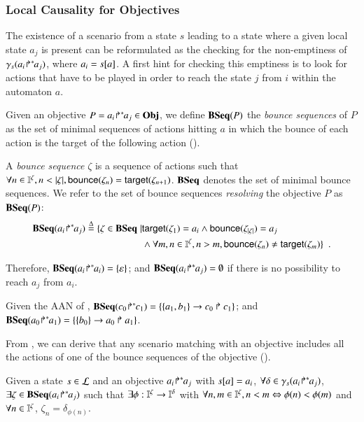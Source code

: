 \subsubsection{Local Causality for Objectives}

The existence of a scenario from a state $s$ leading to a state
where a given local state $a_j$ is present
can be reformulated as the checking for the non-emptiness of $\gamma_s({a_i\!\Rsh^*\!\!a_j})$, where
$a_i=s[{a}]$.
A first hint for checking this emptiness is to look for actions that have to be played in order to
reach the state $j$ from $i$ within the automaton $a$.

Given an objective $P = {a_i\!\Rsh^*\!\!a_j} \in\mathbf{Obj}$, we define $\mathbf{BSeq}(P)$ the \emph{bounce sequences} of
$P$ as the set of minimal sequences of actions hitting $a$ in which the bounce of each action is
the target of the following action ().

\begin{definition}\label{def:bs}
A \emph{bounce sequence} $\zeta$  is a sequence of actions such that
$\forall n\in\indexes{\zeta}, n<|\zeta|,
\bounce{\zeta_{n}} = \target{\zeta_{n+1}}$.
$\mathbf{BSeq}$ denotes the set of minimal bounce sequences.
We refer to the set of bounce sequences \emph{resolving} the objective $P$ as
$\mathbf{BSeq}(P)$:
\begin{align*}
\mathbf{BSeq}({a_i\!\Rsh^*\!\!a_j}) \stackrel{\Delta}= \{ \zeta\in\mathbf{BSeq}\mid & \mathsf{target}(\zeta_1)=a_i\wedge
			    \mathsf{bounce}(\zeta_{|\zeta|})=a_j \\
& \wedge \forall m,n\in\mathbb{I}^{\zeta}, n>m, \mathsf{bounce}(\zeta_n)\neq\mathsf{target}(\zeta_m)
				\}\enspace.
\end{align*}
\end{definition}

Therefore,
$\mathbf{BSeq}({a_i\!\Rsh^*\!\!a_i}) = \{\varepsilon\}$; and
$\mathbf{BSeq}({a_i\!\Rsh^*\!\!a_j}) = \emptyset$ if there is no possibility to reach $a_j$ from
$a_i$.

\begin{example}
Given the AAN of ,
$\mathbf{BSeq}({c_0\!\Rsh^*\!\!c_1}) = \{\{a_1,b_1\}\rightarrow c_0\Rsh c_1\}$;
and 
$\mathbf{BSeq}({a_0\!\Rsh^*\!\!a_1}) = \{\{b_0\}\rightarrow a_0\Rsh a_1\}$.
\end{example}

From , we can derive that any scenario matching with an objective includes all the
actions of one of the bounce sequences of the objective ().

\begin{lemma}
Given a state $s\in \mathcal{L}$ and an objective ${a_i\!\Rsh^*\!\!a_j}$ with $s[{a}]=a_i$,
$\forall\delta\in\gamma_s({a_i\!\Rsh^*\!\!a_j})$,
$\exists\zeta\in\mathbf{BSeq}({a_i\!\Rsh^*\!\!a_j})$ such that
$\exists \phi: \mathbb{I}^{\zeta}\to\mathbb{I}^{\delta}$
with
$\forall n,m\in\mathbb{I}^{\zeta}, n<m \Leftrightarrow \phi(n)<\phi(m)$
and
$\forall n\in\mathbb{I}^{\zeta}$, $\zeta_n = \delta_{\phi(n)}$.
\label{lem:bs-concr}
\end{lemma}




